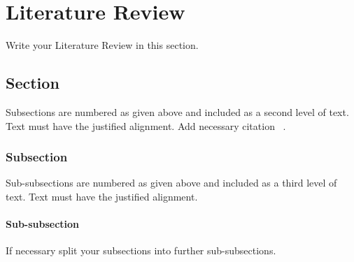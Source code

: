 \chapter{Literature Review}\label{literature_review}
Write your Literature Review in this section.

\section{Section}
Subsections are numbered as given above and included as a second level of text. Text must have the justified alignment. 
Add necessary citation ~\cite{Arora_15}.
\subsection{Subsection}
Sub-subsections are numbered as given above and included as a third level of text. Text must have the justified alignment.
\subsubsection{Sub-subsection}
If necessary split your subsections into further sub-subsections.


\lipsum[3-5]